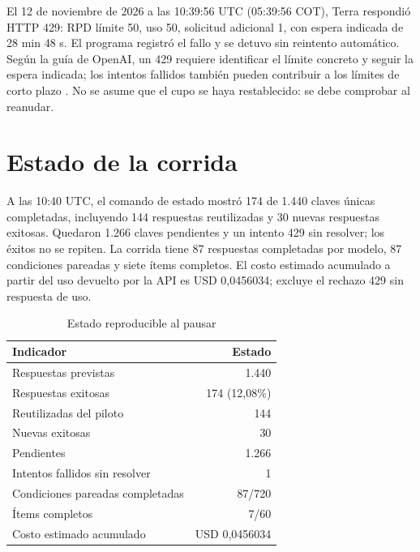 \documentclass[conference]{IEEEtran}
\begin{document}
El 12 de noviembre de 2026 a las 10:39:56 UTC (05:39:56 COT), Terra respondió HTTP 429: RPD límite 50, uso 50, solicitud adicional 1, con espera indicada de 28 min 48 s. El programa registró el fallo y se detuvo sin reintento automático. Según la guía de OpenAI, un 429 requiere identificar el límite concreto y seguir la espera indicada; los intentos fallidos también pueden contribuir a los límites de corto plazo \cite{openai429}. No se asume que el cupo se haya restablecido: se debe comprobar al reanudar.

\section{Estado de la corrida}
A las 10:40 UTC, el comando de estado mostró 174 de 1.440 claves únicas completadas, incluyendo 144 respuestas reutilizadas y 30 nuevas respuestas exitosas. Quedaron 1.266 claves pendientes y un intento 429 sin resolver; los éxitos no se repiten. La corrida tiene 87 respuestas completadas por modelo, 87 condiciones pareadas y siete ítems completos. El costo estimado acumulado a partir del uso devuelto por la API es USD 0,0456034; excluye el rechazo 429 sin respuesta de uso.

\begin{table}[ht]
\caption{Estado reproducible al pausar}
\centering
\begin{tabularx}{\columnwidth}{Xr}
\toprule
Indicador & Estado \\
\midrule
Respuestas previstas & 1.440 \\
Respuestas exitosas & 174 (12,08\%) \\
Reutilizadas del piloto & 144 \\
Nuevas exitosas & 30 \\
Pendientes & 1.266 \\
Intentos fallidos sin resolver & 1 \\
Condiciones pareadas completadas & 87/720 \\
Ítems completos & 7/60 \\
Costo estimado acumulado & USD 0,0456034 \\
\bottomrule
\end{tabularx}
\end{table}
\end{document}
